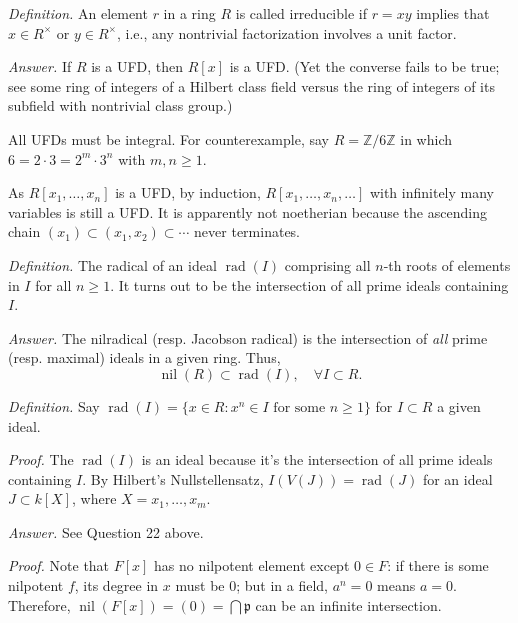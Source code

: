 \documentclass{mathproblems}
\newcommand\Z{\mathbb{Z}}
\DeclareMathOperator{\rad}{rad}
\begin{document}
\begin{questions}
\textit{Definition.} An element $r$ in a ring $R$ is called irreducible if $r=xy$ implies that $x\in R^\times$ or $y\in R^\times$, i.e., any nontrivial factorization involves a unit factor. 

\textit{Answer.} If $R$ is a UFD, then $R[x]$ is a UFD. (Yet the converse fails to be true; see some ring of integers of a Hilbert class field versus the ring of integers of its subfield with nontrivial class group.) 

All UFDs must be integral. For counterexample, say $R=\Z/6\Z$ in which $6=2\cdot 3=2^m\cdot 3^n$ with $m,n\geq 1$.

As $R[x_1,\ldots,x_n]$ is a UFD, by induction, $R[x_1,\ldots,x_n,\ldots]$ with infinitely many variables is still a UFD. It is apparently not noetherian because the ascending chain $(x_1)\subset (x_1,x_2)\subset \cdots$ never terminates.



\textit{Definition.} The radical of an ideal $\rad (I)$ comprising all $n$-th roots of elements in $I$ for all $n\geq 1$. It turns out to be the intersection of all prime ideals containing $I$.

\textit{Answer.} The nilradical (resp. Jacobson radical) is the intersection of \textit{all} prime (resp. maximal) ideals in a given ring. Thus,
$$
\operatorname{nil}(R)\subset\rad(I),\quad \forall I\subset R.
$$


\textit{Definition.} Say $\rad(I)=\{x\in R: x^n\in I \text{ for some } n\geq 1\}$ for $I\subset R$ a given ideal.

\textit{Proof.} The $\rad(I)$ is an ideal because it's the intersection of all prime ideals containing $I$. By Hilbert's Nullstellensatz, $I(V(J))=\rad (J)$ for an ideal $J\subset k[X]$, where $X=x_1,\ldots, x_m$.


\textit{Answer.} See Question 22 above.

\textit{Proof.} Note that $F[x]$ has no nilpotent element except $0\in F$: if there is some nilpotent $f$, its degree in $x$ must be 0; but in a field, $a^n=0$ means $a=0$. Therefore, $\operatorname{nil}(F[x])=(0)=\bigcap \mathfrak{p}$ can be an infinite intersection.


\end{questions}
\end{document}
